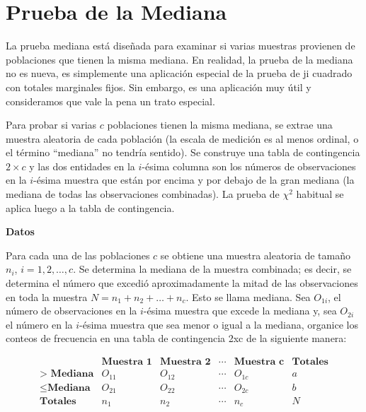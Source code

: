 \documentclass[a4paper,oneside,openany]{book}
\begin{document}
\chapter{Prueba de la Mediana}\label{prueba-de-la-mediana}

La prueba mediana está diseñada para examinar si varias muestras
provienen de poblaciones que tienen la misma mediana. En realidad, la
prueba de la mediana no es nueva, es simplemente una aplicación especial
de la prueba de ji cuadrado con totales marginales fijos. Sin embargo,
es una aplicación muy útil y consideramos que vale la pena un trato
especial.

Para probar si varias \(c\) poblaciones tienen la misma mediana, se
extrae una muestra aleatoria de cada población (la escala de medición es
al menos ordinal, o el término ``mediana'' no tendría sentido). Se
construye una tabla de contingencia \(2\times c\) y las dos entidades en
la \(i\)-ésima columna son los números de observaciones en la
\(i\)-ésima muestra que están por encima y por debajo de la gran mediana
(la mediana de todas las observaciones combinadas). La prueba de
\(\chi^2\) habitual se aplica luego a la tabla de contingencia.

\textbf{Datos}

Para cada una de las poblaciones \(c\) se obtiene una muestra aleatoria
de tamaño \(n_{i}\), \(i = 1,2,\ldots, c\). Se determina la mediana de
la muestra combinada; es decir, se determina el número que excedió
aproximadamente la mitad de las observaciones en toda la muestra
\(N = n_{1} + n_{2}+ \ldots + n_{c}\). Esto se llama mediana. Sea
\(O_{1i}\), el número de observaciones en la \(i\)-ésima muestra que
excede la mediana y, sea \(O_{2i}\) el número en la \(i\)-ésima muestra
que sea menor o igual a la mediana, organice los conteos de frecuencia
en una tabla de contingencia 2xc de la siguiente manera:

\[
\begin{equation*}
\begin{array}{c|c|c|c|c|c}
 & \textbf{Muestra 1}  & \textbf{Muestra 2}    & \cdots & \textbf{Muestra c} &\textbf{Totales}     \\
\hline
\textbf{> Mediana} & O_{11} & O_{12} & \cdots & O_{1c} & a   \\
\hline
\leq \textbf{Mediana} & O_{21} & O_{22} & \cdots & O_{2c} & b\\
\hline
\textbf{Totales}    & n_{1}  & n_{2}  & \cdots & n_{c}  & N \\
\end{array}
\end{equation*}
\]
\end{document}
